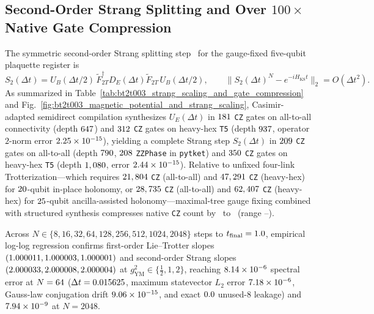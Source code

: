 \documentclass[aps,prx,twocolumn,superscriptaddress,nofootinbib]{revtex4-2}
\begin{document}
\subsection{Second-Order Strang Splitting and Over $100\times$ Native Gate Compression}

The symmetric second-order Strang splitting step~\cite{Strang1968} for the gauge-fixed five-qubit plaquette register is
\begin{equation}
\label{eq:strang_splitting}
S_2(\Delta t) = U_B(\Delta t/2)\,\widetilde{F}_{2T}^\dagger D_E(\Delta t)\widetilde{F}_{2T}\,U_B(\Delta t/2), \qquad \|S_2(\Delta t)^N - e^{-i H_{\mathrm{KS}} t}\|_2 = O(\Delta t^2).
\end{equation}
As summarized in Table~\ref{tab:bt2t003_strang_scaling_and_gate_compression} and Fig.~\ref{fig:bt2t003_magnetic_potential_and_strang_scaling}, Casimir-adapted semidirect compilation synthesizes $U_E(\Delta t)$ in $181$ \texttt{CZ} gates on all-to-all connectivity (depth $647$) and $312$ \texttt{CZ} gates on heavy-hex \texttt{T5} (depth $937$, operator $2$-norm error $2.25 \times 10^{-15}$), yielding a complete Strang step $S_2(\Delta t)$ in $209$ \texttt{CZ} gates on all-to-all (depth $790$, $208$ \texttt{ZZPhase} in \texttt{pytket}) and $350$ \texttt{CZ} gates on heavy-hex \texttt{T5} (depth $1,080$, error $2.44 \times 10^{-15}$). Relative to unfixed four-link Trotterization---which requires $21,804$ \texttt{CZ} (all-to-all) and $47,291$ \texttt{CZ} (heavy-hex) for $20$-qubit in-place holonomy, or $28,735$ \texttt{CZ} (all-to-all) and $62,407$ \texttt{CZ} (heavy-hex) for $25$-qubit ancilla-assisted holonomy---maximal-tree gauge fixing combined with structured synthesis compresses native \texttt{CZ} count by \BTPlaqCompTwentyQAtaRatio\ to \BTPlaqCompTwentyFiveQHhRatio\ (range \BTPlaqCompTwentyQTaOneDec--\BTPlaqCompTwentyFiveQHhOneDec).

Across $N \in \{8, 16, 32, 64, 128, 256, 512, 1024, 2048\}$ steps to $t_{\mathrm{final}} = 1.0$, empirical log-log regression confirms first-order Lie--Trotter slopes $(1.000011, 1.000003, 1.000001)$ and second-order Strang slopes $(2.000033, 2.000008, 2.000004)$ at $g_{\mathrm{YM}}^2 \in \{\tfrac{1}{2}, 1, 2\}$, reaching $8.14 \times 10^{-6}$ spectral error at $N = 64$ ($\Delta t = 0.015625$, maximum statevector $L_2$ error $7.18 \times 10^{-6}$, Gauss-law conjugation drift $9.06 \times 10^{-15}$, and exact $0.0$ unused-$8$ leakage) and $7.94 \times 10^{-9}$ at $N = 2048$.
\end{document}
